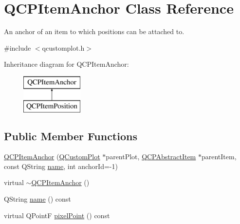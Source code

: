 \hypertarget{class_q_c_p_item_anchor}{}\section{Q\+C\+P\+Item\+Anchor Class Reference}
\label{class_q_c_p_item_anchor}


An anchor of an item to which positions can be attached to.  




{\ttfamily \#include $<$qcustomplot.\+h$>$}

Inheritance diagram for Q\+C\+P\+Item\+Anchor\+:\begin{figure}[H]
\begin{center}
\leavevmode
\includegraphics[height=2.000000cm]{class_q_c_p_item_anchor}
\end{center}
\end{figure}
\subsection*{Public Member Functions}
\begin{DoxyCompactItemize}
\item 
\hyperlink{class_q_c_p_item_anchor_aeb6b681d2bf324db40a915d32ec5624f}{Q\+C\+P\+Item\+Anchor} (\hyperlink{class_q_custom_plot}{Q\+Custom\+Plot} $\ast$parent\+Plot, \hyperlink{class_q_c_p_abstract_item}{Q\+C\+P\+Abstract\+Item} $\ast$parent\+Item, const Q\+String \hyperlink{class_q_c_p_item_anchor_ac93984042a58c875e76847dc3e5f75fe}{name}, int anchor\+Id=-\/1)
\item 
virtual \hyperlink{class_q_c_p_item_anchor_a1868559407600688ee4d1a4621e81ceb}{$\sim$\+Q\+C\+P\+Item\+Anchor} ()
\item 
Q\+String \hyperlink{class_q_c_p_item_anchor_ac93984042a58c875e76847dc3e5f75fe}{name} () const 
\item 
virtual Q\+Point\+F \hyperlink{class_q_c_p_item_anchor_ae92def8f9297c5d73f5806c586517bb3}{pixel\+Point} () const 
\end{DoxyCompactItemize}
